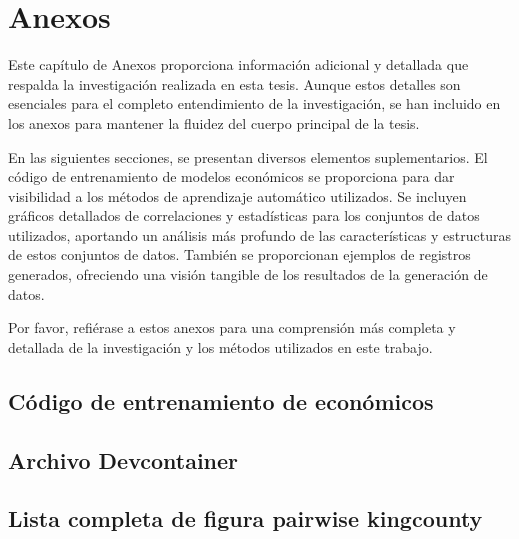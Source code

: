 \chapter{Anexos}
Este capítulo de Anexos proporciona información adicional y detallada que respalda la investigación realizada en esta tesis. Aunque estos detalles son esenciales para el completo entendimiento de la investigación, se han incluido en los anexos para mantener la fluidez del cuerpo principal de la tesis.

En las siguientes secciones, se presentan diversos elementos suplementarios. El código de entrenamiento de modelos económicos se proporciona para dar visibilidad a los métodos de aprendizaje automático utilizados. Se incluyen gráficos detallados de correlaciones y estadísticas para los conjuntos de datos utilizados, aportando un análisis más profundo de las características y estructuras de estos conjuntos de datos. También se proporcionan ejemplos de registros generados, ofreciendo una visión tangible de los resultados de la generación de datos.

Por favor, refiérase a estos anexos para una comprensión más completa y detallada de la investigación y los métodos utilizados en este trabajo.
\section{Código de entrenamiento de económicos}


\section{Archivo Devcontainer}
\label{devcontainer-anexo}

\section{Lista completa de figura pairwise kingcounty}
\label{A-pairwise-kingcounty-top2-a-1}


